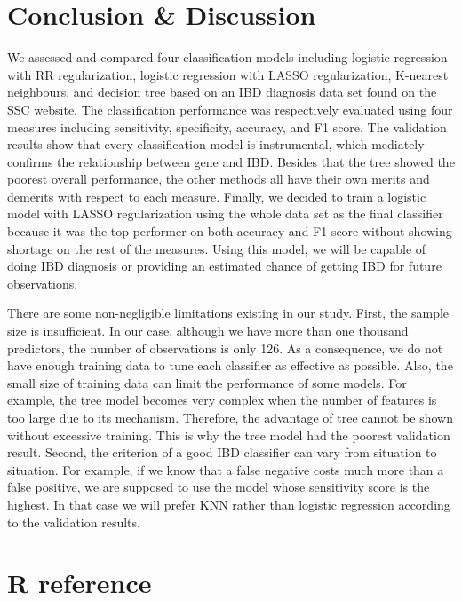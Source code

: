 \documentclass[preprint, 3p,
authoryear]{elsarticle} %
\begin{document}
\hypertarget{conclusion-discussion}{%
\section{Conclusion \& Discussion}\label{conclusion-discussion}}

We assessed and compared four classification models including logistic
regression with RR regularization, logistic regression with LASSO
regularization, K-nearest neighbours, and decision tree based on an IBD
diagnosis data set found on the SSC website. The classification
performance was respectively evaluated using four measures including
sensitivity, specificity, accuracy, and F1 score. The validation results
show that every classification model is instrumental, which mediately
confirms the relationship between gene and IBD. Besides that the tree
showed the poorest overall performance, the other methods all have their
own merits and demerits with respect to each measure. Finally, we
decided to train a logistic model with LASSO regularization using the
whole data set as the final classifier because it was the top performer
on both accuracy and F1 score without showing shortage on the rest of
the measures. Using this model, we will be capable of doing IBD
diagnosis or providing an estimated chance of getting IBD for future
observations.

There are some non-negligible limitations existing in our study. First,
the sample size is insufficient. In our case, although we have more than
one thousand predictors, the number of observations is only 126. As a
consequence, we do not have enough training data to tune each classifier
as effective as possible. Also, the small size of training data can
limit the performance of some models. For example, the tree model
becomes very complex when the number of features is too large due to its
mechanism. Therefore, the advantage of tree cannot be shown without
excessive training. This is why the tree model had the poorest
validation result. Second, the criterion of a good IBD classifier can
vary from situation to situation. For example, if we know that a false
negative costs much more than a false positive, we are supposed to use
the model whose sensitivity score is the highest. In that case we will
prefer KNN rather than logistic regression according to the validation
results.

\hypertarget{r-reference}{%
\section{R reference}\label{r-reference}}
\end{document}
